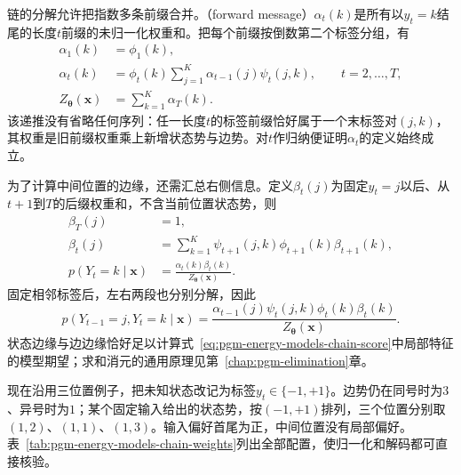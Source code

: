 链的分解允许把指数多条前缀合并。（forward message）$\alpha_t(k)$是所有以$y_t=k$结尾的长度$t$前缀的未归一化权重和。把每个前缀按倒数第二个标签分组，有
\begin{equation}
  \begin{aligned}
    \alpha_1(k)&=\phi_1(k),\\
    \alpha_t(k)&=\phi_t(k)
       \sum_{j=1}^K\alpha_{t-1}(j)\psi_t(j,k),
       \qquad t=2,\ldots,T,\\
    Z_{\bm{\theta}}(\bm{x})&=\sum_{k=1}^K\alpha_T(k).
  \end{aligned}
  \label{eq:pgm-energy-models-forward}
\end{equation}
该递推没有省略任何序列：任一长度$t$的标签前缀恰好属于一个末标签对$(j,k)$，其权重是旧前缀权重乘上新增状态势与边势。对$t$作归纳便证明$\alpha_t$的定义始终成立。

为了计算中间位置的边缘，还需汇总右侧信息。定义$\beta_t(j)$为固定$y_t=j$以后、从$t+1$到$T$的后缀权重和，不含当前位置状态势，则
\begin{equation}
  \begin{aligned}
    \beta_T(j)&=1,\\
    \beta_t(j)&=\sum_{k=1}^K
         \psi_{t+1}(j,k)\phi_{t+1}(k)\beta_{t+1}(k),\\
    p(Y_t=k\mid\bm{x})
      &=\frac{\alpha_t(k)\beta_t(k)}{Z_{\bm{\theta}}(\bm{x})}.
  \end{aligned}
  \label{eq:pgm-energy-models-backward}
\end{equation}
固定相邻标签后，左右两段也分别分解，因此
\begin{equation}
  p(Y_{t-1}=j,Y_t=k\mid\bm{x})
   =\frac{\alpha_{t-1}(j)\psi_t(j,k)
                   \phi_t(k)\beta_t(k)}
          {Z_{\bm{\theta}}(\bm{x})}.
  \label{eq:pgm-energy-models-edge-marginal}
\end{equation}
状态边缘与边边缘恰好足以计算式~\eqref{eq:pgm-energy-models-chain-score}中局部特征的模型期望；求和消元的通用原理见第~\ref{chap:pgm-elimination}章。

现在沿用三位置例子，把未知状态改记为标签$y_t\in\{-1,+1\}$。边势仍在同号时为$3$、异号时为$1$；某个固定输入给出的状态势，按$(-1,+1)$排列，三个位置分别取$(1,2)$、$(1,1)$、$(1,3)$。输入偏好首尾为正，中间位置没有局部偏好。表~\ref{tab:pgm-energy-models-chain-weights}列出全部配置，使归一化和解码都可直接核验。

